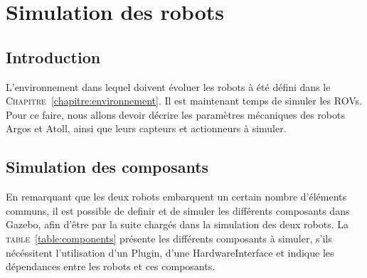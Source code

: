 \chapter{Simulation des robots}
	
	\section{Introduction}

		L'environnement dans lequel doivent évoluer les robots à été défini dans le \textsc{Chapitre}~\ref{chapitre:environnement}. Il est maintenant temps de simuler les \gls{ROV}s. Pour ce faire, nous allons devoir décrire les paramètres mécaniques des robots \gls{Argos} et \gls{Atoll}, ainsi que leurs capteurs et actionneurs à simuler.

	\section{Simulation des composants}
		En remarquant que les deux robots embarquent un certain nombre d'éléments communs, il est possible de definir et de simuler les différents composants dans \gls{Gazebo}, afin d'être par la suite chargés dans la simulation des deux robots. La \textsc{table}~\ref{table:components} présente les différents composants à simuler, s'ils nécéssitent l'utilisation d'un \gls{Plugin}, d'une \gls{HardwareInterface} et indique les dépendances entre les robots et ces composants.

